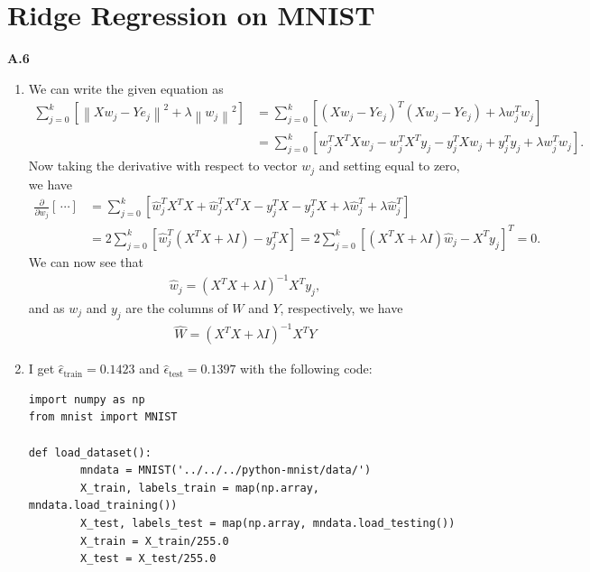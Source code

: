 \documentclass{article}
\newcommand{\norm}[1]{\left\|#1\right\|}
\begin{document}
\newpage

\section*{Ridge Regression on MNIST}

\textbf{A.6}

\begin{enumerate}
        \item
        We can write the given equation as
        \begin{align*}
                \sum_{j=0}^k \left[ \norm{Xw_j - Ye_j}^2 + \lambda \norm{w_j}^2 \right]
                &= \sum_{j=0}^k \left[ (X w_j - Y e_j)^T (X w_j - Y e_j) + \lambda w_j^T w_j \right] \\
                &= \sum_{j=0}^k \left[ w_j^T X^T X w_j - w_j^T X^T y_j - y_j^T X w_j + y_j^T y_j + \lambda w_j^T w_j \right].
        \end{align*}
        Now taking the derivative with respect to vector $w_j$ and setting equal to zero, we have
        \begin{align*}
                \frac{\partial}{\partial w_j} [\,\cdots]
                &= \sum_{j=0}^k \left[ \hat{w}_j^T X^T X + \hat{w}_j^T X^T X - y_j^T X - y_j^T X + \lambda \hat{w}_j^T + \lambda \hat{w}_j^T \right] \\
                &= 2 \sum_{j=0}^k \left[ \hat{w}_j^T (X^T X + \lambda I) - y_j^T X \right]
                = 2 \sum_{j=0}^k \left[ (X^T X + \lambda I) \hat{w}_j - X^T y_j \right]^T = 0.
        \end{align*}
        We can now see that
        \begin{align*}
                \hat{w}_j = (X^T X + \lambda I)^{-1} X^T y_j,
        \end{align*}
        and as $w_j$ and $y_j$ are the columns of $W$ and $Y$, respectively, we have
        \begin{align*}
                \widehat{W} = (X^T X + \lambda I)^{-1} X^T Y
        \end{align*}

        \item
        I get $\hat{\epsilon}_\text{train} = 0.1423$ and $\hat{\epsilon}_\text{test} = 0.1397$ with the following code:
\begin{verbatim}
import numpy as np
from mnist import MNIST

def load_dataset():
        mndata = MNIST('../../../python-mnist/data/')
        X_train, labels_train = map(np.array, mndata.load_training())
        X_test, labels_test = map(np.array, mndata.load_testing())
        X_train = X_train/255.0
        X_test = X_test/255.0


\end{verbatim}
\end{enumerate}
\end{document}
